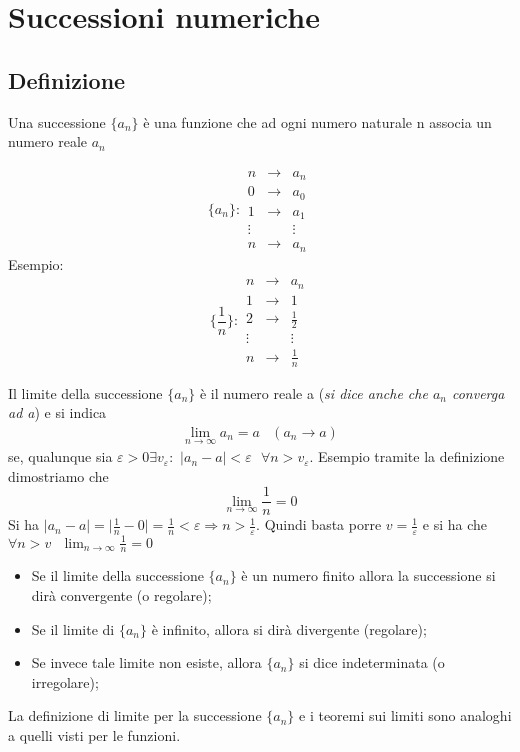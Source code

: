 \chapter{Successioni numeriche}
\section{Definizione}
Una successione $\{a_n\}$ è una funzione che ad ogni numero naturale n associa un numero reale $a_n$
\begin{multicols}{2}
	\begin{equation*}
		\{a_n\}: \begin{matrix}
			n&\to&a_n\\
			0&\to&a_0\\
			1&\to&a_1\\
			\vdots&&\vdots\\
			n&\to&a_n
		\end{matrix}
	\end{equation*}
	Esempio:
	\begin{equation*}
		\bigg\{\frac{1}{n}\bigg\}: \begin{matrix}
			n&\to&a_n\\
			1&\to&1\\
			2&\to&\frac{1}{2}\\
			\vdots&&\vdots\\
			n&\to&\frac{1}{n}
		 \end	{matrix}
	\end{equation*}
\end{multicols}
Il limite della successione $\{a_n\}$ è il numero reale a (\textit{si dice anche che $a_n$ converga ad a}) e si indica
\begin{eqnarray*}
	\lim_{n\to\infty}a_n=a&(a_n\to a)
\end{eqnarray*}
se, qualunque sia $\varepsilon>0 \exists v_\varepsilon:$ $|a_n-a|<\varepsilon\text{ } \forall n>v_\varepsilon$. Esempio tramite la definizione dimostriamo che
\begin{equation*}
	\lim_{n\to\infty}\frac{1}{n}=0
\end{equation*}
Si ha $|a_n-a|=\bigg|\frac{1}{n}-0\bigg|=\frac{1}{n}<\varepsilon\Rightarrow n>\frac{1}{\varepsilon}$. Quindi basta porre $v=\frac{1}{\varepsilon}$ e si ha che $\forall n>v\text{ }\lim_{n\to \infty}\frac{1}{n}=0$
\begin{itemize}
	\item Se il limite della successione $\{a_n\}$ è un numero finito allora la successione si dirà convergente (o regolare);
	\item Se il limite di $\{a_n\}$ è infinito, allora si dirà divergente (regolare);
	\item Se invece tale limite non esiste, allora $\{a_n\}$ si dice indeterminata (o irregolare);
\end{itemize}
La definizione di limite per la successione $\{a_n\}$ e i teoremi sui limiti sono analoghi a quelli visti per le funzioni.

